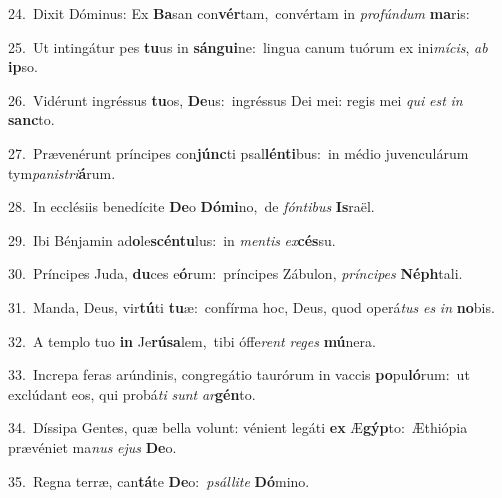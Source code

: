 {\numbfont\textcolor{\numbcolor}{24.}}~Dixit Dóminus: Ex \textbf{Ba}\-san con\-\textbf{vér}\-tam,~\star convértam in \textit{pro}\-\textit{fún}\textit{dum} \textbf{ma}\-ris:\par
{\numbfont\textcolor{\numbcolor}{25.}}~Ut intingátur pes \textbf{tu}\-us in \textbf{sán}\-\textbf{gui}ne:~\star lingua canum tuórum ex ini\-\textit{mí}\-\textit{cis}, \textit{ab} \textbf{ip}\-so.\par
{\numbfont\textcolor{\numbcolor}{26.}}~Vidérunt ingréssus \textbf{tu}\-os, \textbf{De}\-us:~\star ingréssus Dei mei: regis mei \textit{qui} \textit{est} \textit{in} \textbf{sanc}\-to.\par
{\numbfont\textcolor{\numbcolor}{27.}}~Prævenérunt príncipes con\-\textbf{júnc}\-ti psal\-\textbf{lén}\-\textbf{ti}bus:~\star in médio juvenculárum tym\-\textit{pa}\-\textit{nis}\textit{tri}\textbf{á}rum.\par
{\numbfont\textcolor{\numbcolor}{28.}}~In ecclésiis benedícite \textbf{De}\-o \textbf{Dó}\-\textbf{mi}no,~\star de \textit{fón}\-\textit{ti}\textit{bus} \textbf{Is}\-raël.\par
{\numbfont\textcolor{\numbcolor}{29.}}~Ibi Bénjamin ad\-\textbf{o}\-le\-\textbf{scén}\-\textbf{tu}lus:~\star in \textit{men}\-\textit{tis} \textit{ex}\-\textbf{cés}su.\par
{\numbfont\textcolor{\numbcolor}{30.}}~Príncipes Juda, \textbf{du}\-ces e\-\textbf{ó}\-rum:~\star príncipes Zábulon, \textit{prín}\-\textit{ci}\textit{pes} \textbf{Néph}\-tali.\par
{\numbfont\textcolor{\numbcolor}{31.}}~Manda, Deus, vir\-\textbf{tú}\-ti \textbf{tu}\-æ:~\star confírma hoc, Deus, quod operá\textit{tus} \textit{es} \textit{in} \textbf{no}\-bis.\par
{\numbfont\textcolor{\numbcolor}{32.}}~A templo tuo \textbf{in} Je\-\textbf{rú}\-\textbf{sa}lem,~\star tibi óffe\textit{rent} \textit{re}\-\textit{ges} \textbf{mú}\-nera.\par
{\numbfont\textcolor{\numbcolor}{33.}}~Increpa feras arúndinis, congregátio taurórum in vaccis \textbf{po}\-pu\-\textbf{ló}\-rum:~\star ut exclúdant eos, qui probá\textit{ti} \textit{sunt} \textit{ar}\-\textbf{gén}to.\par
{\numbfont\textcolor{\numbcolor}{34.}}~Díssipa Gentes, quæ bella volunt: vénient legáti \textbf{ex} Æ\-\textbf{gýp}\-to:~\star Æthiópia prævéniet ma\textit{nus} \textit{e}\-\textit{jus} \textbf{De}\-o.\par
{\numbfont\textcolor{\numbcolor}{35.}}~Regna terræ, can\-\textbf{tá}\-te \textbf{De}\-o:~\star \textit{psál}\-\textit{li}\textit{te} \textbf{Dó}\-mino.\par

